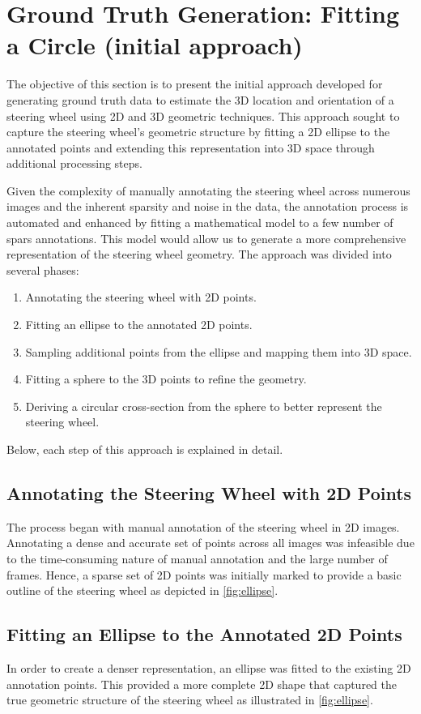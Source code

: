 \section{Ground Truth Generation: Fitting a Circle (initial approach)}

The objective of this section is to present the initial 
approach developed for generating ground truth data to 
estimate the 3D location and orientation of a steering wheel 
using 2D and 3D geometric techniques. This approach sought 
to capture the steering wheel’s geometric structure by 
fitting a 2D ellipse to the annotated points and extending this 
representation into 3D space through additional processing 
steps.


Given the complexity of manually annotating the steering wheel 
across numerous images and the inherent sparsity and noise in 
the data, the annotation process is automated and enhanced by fitting a mathematical model to a few number of spars annotations. This model would allow us to generate a 
more comprehensive representation of the steering wheel 
geometry. The approach was divided into several phases:
\begin{enumerate}
    \item Annotating the steering wheel with 2D points.
    \item Fitting an ellipse to the annotated 2D points.
    \item Sampling additional points from the ellipse and mapping them into 3D space.
    \item Fitting a sphere to the 3D points to refine the geometry.
    \item Deriving a circular cross-section from the sphere to better represent the steering wheel.
\end{enumerate}
Below, each step of this approach is explained in detail.

\subsection{Annotating the Steering Wheel with 2D Points}
The process began with manual annotation of the steering wheel 
in 2D images. Annotating a dense and accurate set of points 
across all images was infeasible due to the time-consuming 
nature of manual annotation and the large number of frames. 
Hence, a sparse set of 2D points was initially marked to 
provide a basic outline of the steering wheel as depicted in 
\cref{fig:ellipse}.

\subsection{Fitting an Ellipse to the Annotated 2D Points}
In order to create a denser representation, an ellipse was fitted to the existing 2D annotation points. This provided 
a more complete 2D shape that captured the true geometric 
structure of the steering wheel as illustrated in \cref{fig:ellipse}. 

